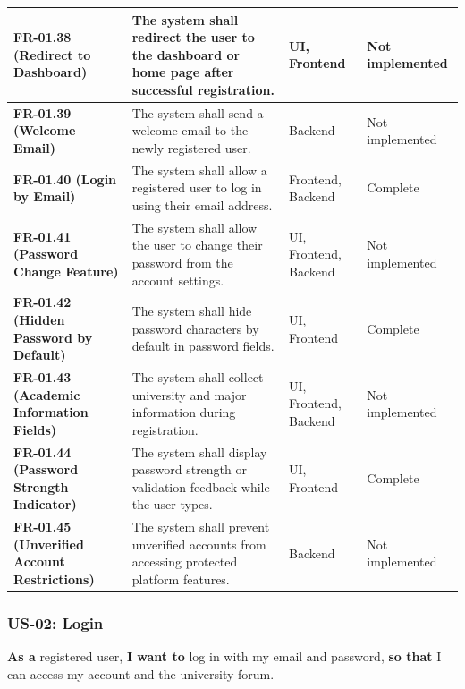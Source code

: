 \documentclass[12pt]{article}
\begin{document}
\begin{longtable}{|>{\raggedright\arraybackslash}p{}|>{\raggedright\arraybackslash}p{}|>{\raggedright\arraybackslash}p{}|>{\raggedright\arraybackslash}p{}|}
\textbf{FR-01.38 (Redirect to Dashboard)} & The system shall redirect the user to the dashboard or home page after successful registration. & UI, Frontend & Not implemented \\ \hline
\textbf{FR-01.39 (Welcome Email)} & The system shall send a welcome email to the newly registered user. & Backend & Not implemented \\ \hline
\textbf{FR-01.40 (Login by Email)} & The system shall allow a registered user to log in using their email address. & Frontend, Backend & Complete \\ \hline
\textbf{FR-01.41 (Password Change Feature)} & The system shall allow the user to change their password from the account settings. & UI, Frontend, Backend & Not implemented \\ \hline
\textbf{FR-01.42 (Hidden Password by Default)} & The system shall hide password characters by default in password fields. & UI, Frontend & Complete \\ \hline
\textbf{FR-01.43 (Academic Information Fields)} & The system shall collect university and major information during registration. & UI, Frontend, Backend & Not implemented \\ \hline
\textbf{FR-01.44 (Password Strength Indicator)} & The system shall display password strength or validation feedback while the user types. & UI, Frontend & Complete \\ \hline
\textbf{FR-01.45 (Unverified Account Restrictions)} & The system shall prevent unverified accounts from accessing protected platform features. & Backend & Not implemented \\ \hline
\end{longtable}
\endgroup
\par\medskip

\hypertarget{sec:us-02-login}{}
\subsubsection*{US-02: Login}
\par\medskip

\textbf{As a} registered user, \textbf{I want to} log in with my email and password, \textbf{so that} I can access my account and the university forum.
\par\medskip
\end{document}
